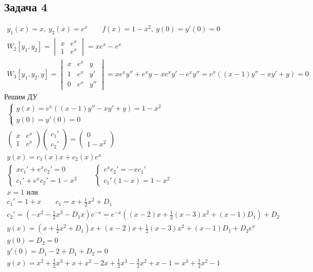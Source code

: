 \subsection*{Задача 4}
	\begin{gather*}
	y_1(x) = x,\ y_2(x) = e^{x}\qquad
	f(x) = 1-x^2,\ y(0) = y'(0) = 0\\
	W_2[y_1,y_2] =
	\begin{vmatrix}
		x & e^x \\ 1 & e^x
	\end{vmatrix}
	=
	xe^x - e^x\\
	W_3[y_1,y_2,y] = 
	\begin{vmatrix}
		x & e^x & y\\
		1 & e^x & y'\\
		0 & e^x & y''
	\end{vmatrix}
	=
	xe^x y'' + e^x y - xe^x y' - e^x y'' =
	e^x\left((x-1)y'' - xy' + y\right) = 0
	\end{gather*}
	Решим ДУ
	\begin{gather*}
	\begin{cases}
		y(x) = e^x((x-1)y'' - xy' + y) = 1 - x^2\\
		y(0) = y'(0) = 0
	\end{cases}\\
	\begin{pmatrix}
		x & e^x \\ 1 & e^x
	\end{pmatrix}
	\begin{pmatrix}
		c_1' \\ c_2'
	\end{pmatrix}
	=
	\begin{pmatrix}
		0 \\ 1-x^2
	\end{pmatrix}\\
	y(x) = c_1(x)x + c_2(x)e^x\\
	\begin{cases}
		xc_1' + e^x c_2' = 0\\
		c_1' + e^xc_2' = 1-x^2
	\end{cases}\qquad
	\begin{cases}
		e^xc_2' = -xc_1'\\
		c_1'(1-x) = 1-x^2
	\end{cases}\\
	x = 1 \text{ или }\\
	c_1' = 1+x\qquad c_1 = x + \frac{1}{2}x^2 + D_1\\
	c_2' = (-x^2 - \frac{1}{2}x^3 - D_1x)e^{-x} =
	e^{-x}((x-2)x + \frac{1}{2}(x-3)x^2 + (x-1)D_1) + D_2\\
	y(x) = (x + \frac{1}{2}x^2 + D_1)x + (x-2)x + \frac{1}{2}(x-3)x^2 + (x-1)D_1 + D_2 e^x\\
	y(0) = D_2 = 0\\
	y'(0) = D_1 - 2 + D_1 + D_2 = 0\\
	y(x) = x^2 + \frac{1}{2}x^3 + x + x^2 - 2x + \frac{1}{2}x^3 - \frac{3}{2}x^2 + x - 1 = x^3 + \frac{1}{2}x^2 - 1
	\end{gather*}
\vskip 0.4in
	
